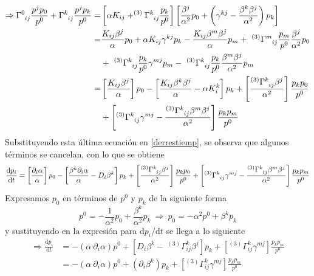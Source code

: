 \documentclass[11pt,twoside,openright,spanish]{report}
\numberwithin{equation}{chapter}
\numberwithin{figure}{chapter}
\numberwithin{table}{chapter}
\begin{document}
\begin{align*}
\Rightarrow \tensor{\Gamma}{^0_i_j}\frac{p^jp_0}{p^0}+\tensor{\Gamma}{^k_i_j}\frac{p^jp_k}{p^0}=&\left[\alpha K_{ij}+^{(3)}\tensor{\Gamma}{^k_i_j}\frac{p_k}{p^0}\right]\left[\frac{\beta^j}{\alpha^2}p_0+\left(\gamma^{kj}-\frac{\beta^k\beta^j}{\alpha^2}\right)p_k\right]\\
=&\frac{K_{ij}\beta^j}{\alpha}p_0+\alpha K_{ij}\gamma^{kj}p_k-\frac{K_{ij}\beta^m\beta^j}{\alpha}p_m+\ ^{(3)}\tensor{\Gamma}{^m_i_j}\frac{p_m}{p^0}\frac{\beta^j}{\alpha^2}p_0\\ 
&+\ ^{(3)}\tensor{\Gamma}{^k_i_j}\frac{p_k}{p^0}\gamma^{mj}p_m-\ ^{(3)}\tensor{\Gamma}{^k_i_j}\frac{p_k}{p^0}\frac{\beta^m\beta^j}{\alpha^2}p_m\\
=&\left[\frac{K_{ij}\beta^j}{\alpha}\right]p_0-\left[\frac{K_{ij}\beta^k\beta^j}{\alpha}-\alpha K_{i}^k\right]p_k+\left[\frac{^{(3)}\tensor{\Gamma}{^k_i_j}\beta^j}{\alpha^2}\right]\frac{p_kp_0}{p^0}\\
&+\left[^{(3)}\tensor{\Gamma}{^k_i_j}\gamma^{mj}-\frac{^{(3)}\tensor{\Gamma}{^k_i_j}\beta^m\beta^j}{\alpha^2}\right]\frac{p_kp_m}{p^0}
\end{align*}
Substituyendo esta última ecuación en \eqref{derrestiemp}, se observa que algunos términos se cancelan, con lo que se obtiene
\begin{align}
\nonumber
\frac{\text{d}p_i}{\text{d}t}=\left[\frac{\partial_i\alpha}{\alpha}\right]p_0-\left[\frac{\beta^k\partial_i\alpha}{\alpha}-D_i\beta^k\right]p_k+\left[\frac{^{(3)}\tensor{\Gamma}{^k_i_j}\beta^j}{\alpha^2}\right]\frac{p_kp_0}{p^0}+\left[^{(3)}\tensor{\Gamma}{^k_i_j}\gamma^{mj}-\frac{^{(3)}\tensor{\Gamma}{^k_i_j}\beta^m\beta^j}{\alpha^2}\right]\frac{p_kp_m}{p^0}
\end{align}
Expresamos $p_0$ en términos de $p^0$ y $p_k$ de la siguiente forma
\begin{equation*}
p^0=-\frac{1}{\alpha^2}p_0+\frac{\beta^k}{\alpha^2}p_k\ \Rightarrow\ p_0=-\alpha^2p^0+\beta^kp_k
\end{equation*}
y sustituyendo en la expresión para $\text{d}p_i/\text{d}t$ se llega a lo siguiente
\begin{align*}
\Rightarrow\frac{\text{d}p_i}{\text{d}t}&=-\left(\alpha\ \partial_i\alpha\right)p^0+\left[D_i\beta^k-\ ^{(3)}\Gamma^k_{ij}\beta^j\right]p_k+\left[^{(3)}\Gamma_{ij}^k\gamma^{mj}\right]\frac{p_kp_m}{p^0}\\
&=-\left(\alpha\ \partial_i\alpha\right)p^0+\left(\partial_i\beta^k\right)p_k+\left[^{(3)}\Gamma_{ij}^k\gamma^{mj}\right]\frac{p_kp_m}{p^0}
\end{align*}
\end{document}
